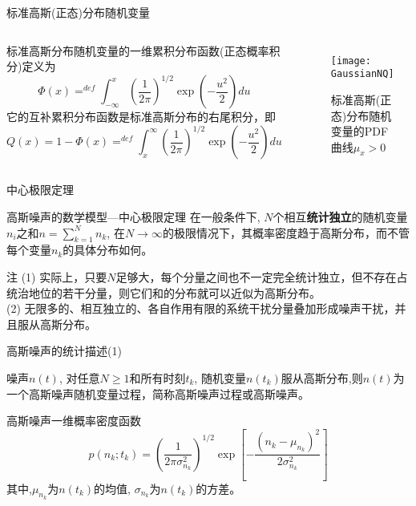 \begin{frame}{标准高斯(正态)分布随机变量}
\begin{columns}
标准高斯分布随机变量的一维累积分布函数(正态概率积分)定义为
\[\Phi(x)\mathop{=}^{def}\int_{-\infty}^{x}\left(\frac{1}{2\pi}\right)^{1/2}\exp\left(-\frac{u^2}{2}\right)du \]
它的互补累积分布函数是标准高斯分布的右尾积分，即
\[Q(x)=1-\Phi(x)\mathop{=}^{def}\int_{x}^{\infty}\left(\frac{1}{2\pi}\right)^{1/2}\exp\left(-\frac{u^2}{2}\right)du \]
\begin{figure}[!h]
\centering
\texttt{[image: GaussianNQ]}\\
\caption{标准高斯(正态)分布随机变量的PDF曲线$\mu_x>0$}
\end{figure}
\end{columns}
\end{frame}


\begin{frame}{中心极限定理}
\begin{block}{高斯噪声的数学模型---中心极限定理}
在一般条件下, $N$个相互\textbf{统计独立}的随机变量$n_i$之和$n=\sum\limits_{k=1}^{N}n_k$, 在$N\to\infty$的极限情况下，其概率密度趋于高斯分布，而不管每个变量$n_k$的具体分布如何。
\end{block}
\begin{block}{注}
	(1) 实际上，只要$N$足够大，每个分量之间也不一定完全统计独立，但不存在占统治地位的若干分量，则它们和的分布就可以近似为高斯分布。\\
	(2) 无限多的、相互独立的、各自作用有限的系统干扰分量叠加形成噪声干扰，并且服从高斯分布。
\end{block}
\end{frame}

\begin{frame}{高斯噪声的统计描述(1)}
\begin{definition}[高斯噪声]
	噪声$n(t)$, 对任意$N\ge 1$和所有时刻$t_k$, 随机变量$n(t_k)$服从高斯分布,则$n(t)$为一个高斯噪声随机变量过程，简称高斯噪声过程或高斯噪声。
\end{definition}
\begin{block}{高斯噪声一维概率密度函数}
	\[p(n_k;t_k)=(\frac{1}{2\pi\sigma_{n_k}^2})^{1/2}\exp\left[-\frac{(n_k-\mu_{n_k})^2}{2\sigma_{n_k}^2}\right] \]
	其中,$\mu_{n_k}$为$n(t_k)$的均值, $\sigma_{n_k}$为$n(t_k)$的方差。
\end{block}
\end{frame}

